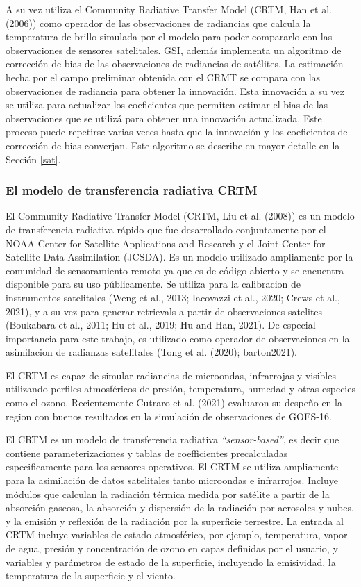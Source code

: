 \documentclass[12pt,oneside,a4paper]{reedthesis}
\begin{document}
A su vez utiliza el Community Radiative Transfer Model (CRTM, Han et al. (2006)) como operador de las observaciones de radiancias que calcula la temperatura de brillo simulada por el modelo para poder compararlo con las observaciones de sensores satelitales.
GSI, además implementa un algoritmo de corrección de bias de las observaciones de radiancias de satélites.
La estimación hecha por el campo preliminar obtenida con el CRMT se compara con las observaciones de radiancia para obtener la innovación.
Esta innovación a su vez se utiliza para actualizar los coeficientes que permiten estimar el bias de las observaciones que se utilizá para obtener una innovación actualizada. Este proceso puede repetirse varias veces hasta que la innovación y los coeficientes de corrección de bias converjan.
Este algoritmo se describe en mayor detalle en la Sección \ref{sat}.

\hypertarget{el-modelo-de-transferencia-radiativa-crtm}{%
\subsubsection{El modelo de transferencia radiativa CRTM}\label{el-modelo-de-transferencia-radiativa-crtm}}

El Community Radiative Transfer Model (CRTM, Liu et al. (2008)) es un modelo de transferencia radiativa rápido que fue desarrollado conjuntamente por el NOAA Center for Satellite Applications and Research y el Joint Center for Satellite Data Assimilation (JCSDA). Es un modelo utilizado ampliamente por la comunidad de sensoramiento remoto ya que es de código abierto y se encuentra disponible para su uso públicamente. Se utiliza para la calibracion de instrumentos satelitales (Weng et al., 2013; Iacovazzi et al., 2020; Crews et al., 2021), y a su vez para generar retrievals a partir de observaciones satelites (Boukabara et al., 2011; Hu et al., 2019; Hu and Han, 2021). De especial importancia para este trabajo, es utilizado como operador de observaciones en la asimilacion de radianzas satelitales (Tong et al. (2020); barton2021).

El CRTM es capaz de simular radiancias de microondas, infrarrojas y visibles utilizando perfiles atmosféricos de presión, temperatura, humedad y otras especies como el ozono. Recientemente Cutraro et al. (2021) evaluaron su despeño en la region con buenos resultados en la simulación de observaciones de GOES-16.

El CRTM es un modelo de transferencia radiativa \emph{``sensor-based''}, es decir que contiene parameterizaciones y tablas de coefficientes precalculadas especificamente para los sensores operativos. El CRTM se utiliza ampliamente para la asimilación de datos satelitales tanto microondas e infrarrojos. Incluye módulos que calculan la radiación térmica medida por satélite a partir de la absorción gaseosa, la absorción y dispersión de la radiación por aerosoles y nubes, y la emisión y reflexión de la radiación por la superficie terrestre. La entrada al CRTM incluye variables de estado atmosférico, por ejemplo, temperatura, vapor de agua, presión y concentración de ozono en capas definidas por el usuario, y variables y parámetros de estado de la superficie, incluyendo la emisividad, la temperatura de la superficie y el viento.
\end{document}
